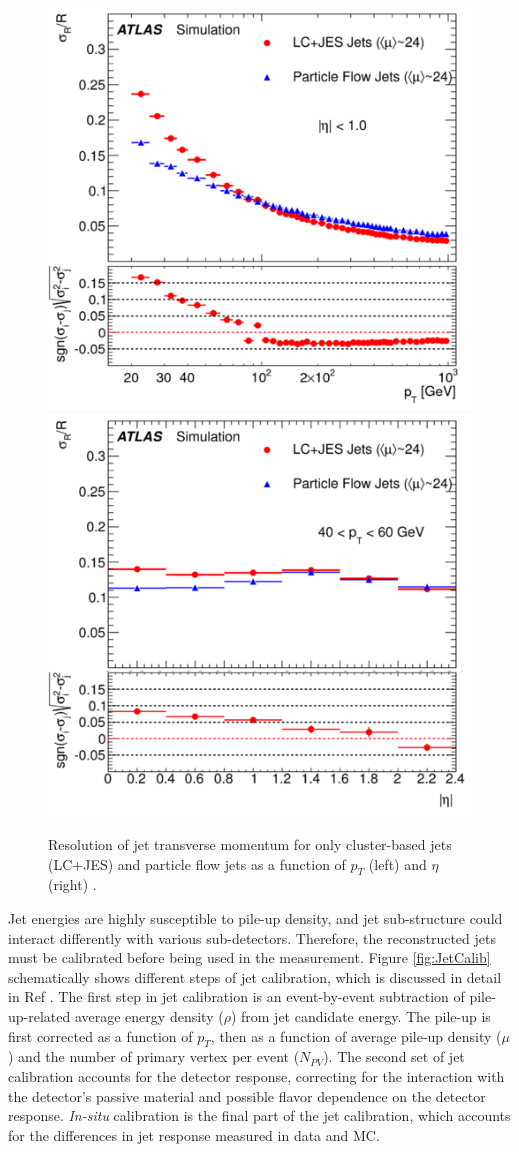 \begin{figure}[!htb]
    \centering
    \includegraphics[width=.48\linewidth]{figures/LHC/Pflow_vs_Calo_pt.pdf}
    \includegraphics[width=.48\linewidth]{figures/LHC/Pflow_vs_Calo_eta.pdf}
    \caption{ Resolution of jet transverse momentum for only cluster-based jets (LC+JES) and particle flow jets as a function of $p_{T}$ (left) and $\eta$ (right) \cite{ParticleFlow}.\label{fig:PflowvsCalo}}
\end{figure}

Jet energies are highly susceptible to pile-up density, and jet sub-structure could interact differently with various sub-detectors. Therefore, the reconstructed jets must be calibrated before being used in the measurement. Figure \ref{fig:JetCalib} schematically shows different steps of jet calibration, which is discussed in detail in Ref \cite{JetCalib}. The first step in jet calibration is an event-by-event subtraction of pile-up-related average energy density ($\rho$) from jet candidate energy. The pile-up is first corrected as a function of $p_{T}$, then as a function of average pile-up density ($\mu$) and the number of primary vertex per event ($N_{PV}$). The second set of jet calibration accounts for the detector response, correcting for the interaction with the detector's passive material and possible flavor dependence on the detector response. \textit{In-situ} calibration is the final part of the jet calibration, which accounts for the differences in jet response measured in data and MC. 

